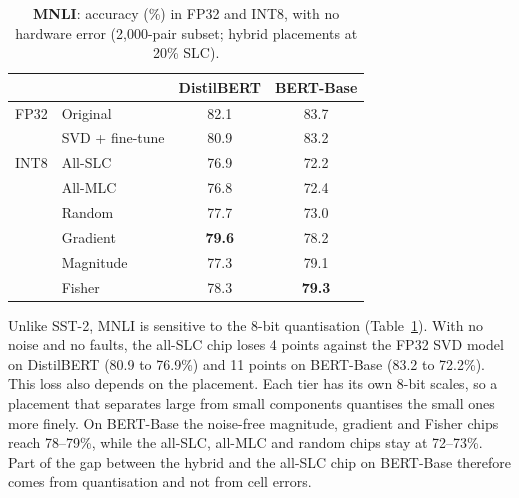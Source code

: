 \documentclass[conference]{IEEEtran}
\begin{document}
\begin{table}[t]
\caption{\textbf{MNLI}: accuracy (\%) in FP32 and INT8, with no hardware error (2,000-pair subset; hybrid
placements at 20\% SLC).}
\label{tab:mnli_int8}
\centering
\small
\begin{tabular}{@{}llcc@{}}
\toprule
 & & DistilBERT & BERT-Base \\
\midrule
FP32 & Original          & 82.1 & 83.7 \\
     & SVD + fine-tune   & 80.9 & 83.2 \\
\midrule
INT8 & All-SLC           & 76.9 & 72.2 \\
     & All-MLC           & 76.8 & 72.4 \\
     & Random            & 77.7 & 73.0 \\
     & Gradient          & \textbf{79.6} & 78.2 \\
     & Magnitude         & 77.3 & 79.1 \\
     & Fisher            & 78.3 & \textbf{79.3} \\
\bottomrule
\end{tabular}
\end{table}

Unlike SST-2, MNLI is sensitive to the 8-bit quantisation (Table~\ref{tab:mnli_int8}). With no noise and no
faults, the all-SLC chip loses 4 points against the FP32 SVD model on DistilBERT (80.9
to 76.9\%) and 11 points on BERT-Base (83.2 to 72.2\%). This loss also depends on the placement. Each tier
has its own 8-bit scales, so a placement that separates large from small components quantises the small
ones more finely. On BERT-Base the noise-free magnitude, gradient and Fisher chips reach 78--79\%, while the
all-SLC, all-MLC and random chips stay at 72--73\%. Part of the gap between the hybrid and the all-SLC chip
on BERT-Base therefore comes from quantisation and not from cell errors.
\end{document}
